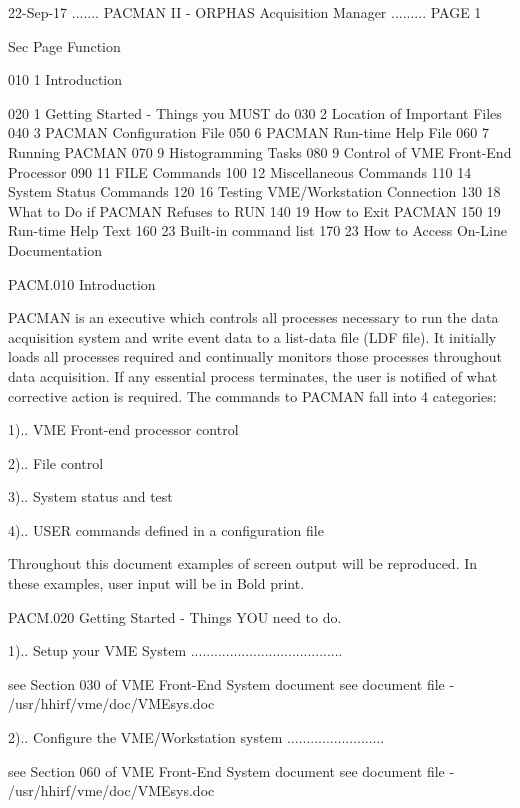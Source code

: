    22-Sep-17 ....... PACMAN II - ORPHAS Acquisition Manager ......... PAGE   1
 
 
 
   Sec Page               Function
 
   010   1  Introduction
 
   020   1  Getting Started - Things you MUST do
   030   2  Location of Important Files
   040   3  PACMAN Configuration File
   050   6  PACMAN Run-time Help File
   060   7  Running PACMAN
   070   9  Histogramming Tasks
   080   9  Control of VME Front-End Processor
   090  11  FILE Commands
   100  12  Miscellaneous Commands
   110  14  System Status Commands
   120  16  Testing VME/Workstation Connection
   130  18  What to Do if PACMAN Refuses to RUN
   140  19  How to Exit PACMAN
   150  19  Run-time Help Text
   160  23  Built-in command list
   170  23  How to Access On-Line Documentation
 
   PACM.010 Introduction
 
   PACMAN  is  an  executive which controls all processes necessary to run the
   data acquisition system and write event  data  to  a  list-data  file  (LDF
   file).  It  initially loads all processes required and continually monitors
   those processes throughout  data  acquisition.  If  any  essential  process
   terminates,  the  user  is  notified of what corrective action is required.
   The commands to PACMAN fall into 4 categories:
 
   1).. VME Front-end processor control
 
   2).. File control
 
   3).. System status and test
 
   4).. USER commands defined in a configuration file
 
   Throughout this document examples of screen output will be  reproduced.  In
   these examples, user input will be in Bold print.
 
 
   PACM.020 Getting Started - Things YOU need to do.
 
       1).. Setup your VME System .......................................
 
            see Section 030 of VME Front-End System document
            see document file - /usr/hhirf/vme/doc/VMEsys.doc
 
       2).. Configure the VME/Workstation system .........................
 
            see Section 060 of VME Front-End System document
            see document file - /usr/hhirf/vme/doc/VMEsys.doc
 
